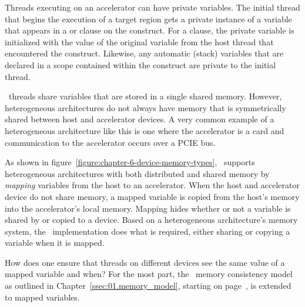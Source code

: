 Threads executing on an accelerator can have private variables.  The initial
thread that begins the execution of a target region gets a private instance of
a variable that appears in a  or  clause on the
 construct.  For a  clause, the private variable
is initialized with the value of the original variable from the host thread
that encountered the construct.  Likewise, any automatic (stack)
variables that are declared in a scope contained within the construct
are private to the initial thread.

\OMP\ threads 
share variables that are stored in a single shared memory.  However, 
heterogeneous architectures do not always have memory that is symmetrically shared between
host and accelerator devices.  A very common example of a 
heterogeneous architecture like this is one where the accelerator is a card 
and communication to the accelerator occurs over a PCIE bus. 

As shown in figure~\ref{figure:chapter-6-device-memory-types}, \OMP\ supports
heterogeneous architectures with both distributed and shared memory by \emph{mapping}
variables from the host to an accelerator.
When the host and accelerator device do not share memory, a mapped variable
is copied from the host's memory into the accelerator's local memory.
Mapping hides whether or not a variable is shared by or copied to a device.
Based on a heterogeneous architecture's memory system, the \OMP\
implementation does what is required, either sharing or copying a variable when it
is mapped.

\begin{figure*}[!tbhp]
\centering
{}
\caption{ \textbf{A mapped variable in shared or distributed memory} -- \small
        A mapped variable may be in either shared or distributed memory.
        The OpenMP implementation determines if copies are required.
        }
\label{figure:chapter-6-device-memory-types}
\end{figure*}

How does one ensure that threads on different devices see the same
value of a mapped variable and when?  For the most part, the \OMP\ memory
consistency model as outlined in Chapter~\ref{ssec:01.memory_model}, starting on
page~\pageref{ssec:01.memory_model}, is extended to mapped variables.  

